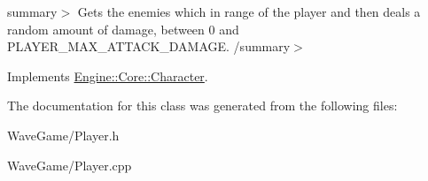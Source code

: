 summary$>$ Gets the enemies which in range of the player and then deals a random amount of damage, between 0 and P\+L\+A\+Y\+E\+R\+\_\+\+M\+A\+X\+\_\+\+A\+T\+T\+A\+C\+K\+\_\+\+D\+A\+M\+A\+GE. /summary$>$ 

Implements \hyperlink{class_engine_1_1_core_1_1_character}{Engine\+::\+Core\+::\+Character}.



The documentation for this class was generated from the following files\+:\begin{DoxyCompactItemize}
\item 
Wave\+Game/Player.\+h\item 
Wave\+Game/Player.\+cpp\end{DoxyCompactItemize}
